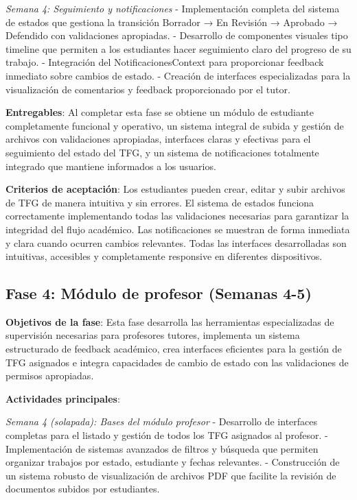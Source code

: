 \documentclass[12pt,a4paper,oneside]{report}
\begin{document}
\emph{Semana 4: Seguimiento y notificaciones} - Implementación completa del sistema de estados que gestiona la transición Borrador → En Revisión → Aprobado → Defendido con validaciones apropiadas. - Desarrollo de componentes visuales tipo timeline que permiten a los estudiantes hacer seguimiento claro del progreso de su trabajo. - Integración del NotificacionesContext para proporcionar feedback inmediato sobre cambios de estado. - Creación de interfaces especializadas para la visualización de comentarios y feedback proporcionado por el tutor.

\textbf{Entregables}: Al completar esta fase se obtiene un módulo de estudiante completamente funcional y operativo, un sistema integral de subida y gestión de archivos con validaciones apropiadas, interfaces claras y efectivas para el seguimiento del estado del TFG, y un sistema de notificaciones totalmente integrado que mantiene informados a los usuarios.

\textbf{Criterios de aceptación}: Los estudiantes pueden crear, editar y subir archivos de TFG de manera intuitiva y sin errores. El sistema de estados funciona correctamente implementando todas las validaciones necesarias para garantizar la integridad del flujo académico. Las notificaciones se muestran de forma inmediata y clara cuando ocurren cambios relevantes. Todas las interfaces desarrolladas son intuitivas, accesibles y completamente responsive en diferentes dispositivos.

\subsection{Fase 4: Módulo de profesor (Semanas
4-5)}\label{fase-4-muxf3dulo-de-profesor-semanas-4-5}

\textbf{Objetivos de la fase}: Esta fase desarrolla las herramientas especializadas de supervisión necesarias para profesores tutores, implementa un sistema estructurado de feedback académico, crea interfaces eficientes para la gestión de TFG asignados e integra capacidades de cambio de estado con las validaciones de permisos apropiadas.

\textbf{Actividades principales}:

\emph{Semana 4 (solapada): Bases del módulo profesor} - Desarrollo de interfaces completas para el listado y gestión de todos los TFG asignados al profesor. - Implementación de sistemas avanzados de filtros y búsqueda que permiten organizar trabajos por estado, estudiante y fechas relevantes. - Construcción de un sistema robusto de visualización de archivos PDF que facilite la revisión de documentos subidos por estudiantes.
\end{document}
